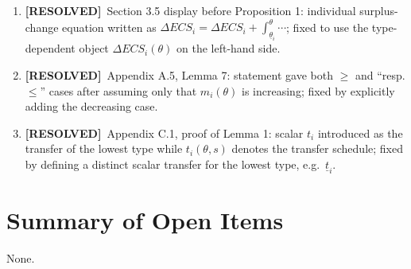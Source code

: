\documentclass{class}
\newcommand{\ok}{\textcolor{ok}{\textbf{[RESOLVED]}}}
\begin{document}
\begin{enumerate}[leftmargin=1.5cm]
\item \ok\ Section 3.5 display before Proposition 1: individual surplus-change equation written as \(\Delta ECS_i=\Delta ECS_i+\int_{\underline\theta_i}^{\theta}\cdots\); fixed to use the type-dependent object \(\Delta ECS_i(\theta)\) on the left-hand side.
\item \ok\ Appendix A.5, Lemma 7: statement gave both \(\geq\) and ``resp. \(\leq\)'' cases after assuming only that \(m_i(\theta)\) is increasing; fixed by explicitly adding the decreasing case.
\item \ok\ Appendix C.1, proof of Lemma 1: scalar \(t_i\) introduced as the transfer of the lowest type while \(t_i(\theta,s)\) denotes the transfer schedule; fixed by defining a distinct scalar transfer for the lowest type, e.g.\ \(\underline t_i\).
\end{enumerate}

\section*{Summary of Open Items}

None.
\end{document}
